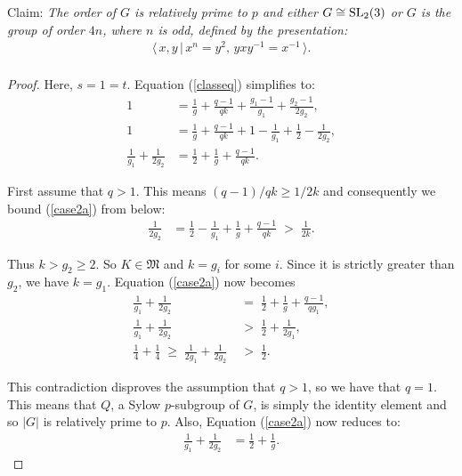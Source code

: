 \begin{theorem}[Case II]
Claim: \textit{The order of $G$ is relatively prime to $p$ and either $G \cong \operatorname{SL}_2(3)$ or $G$ is the group of order $4n$, where $n$ is odd, defined by the presentation:}
\begin{align*} \langle \, x,y \, | \, x^n = y^2, \, yxy^{-1} = x^{-1} \, \rangle. \\
\end{align*}
\end{theorem}
\begin{proof} Here, $s = 1 = t$. Equation (\ref{classeq}) simplifies to:
\begin{align}\label{case2a} 1 &= \frac{1}{g} + \frac{q-1}{qk} + \frac{g_1-1}{g_1} +  \frac{g_2-1}{2g_2}, \nonumber
\\ 1 &= \frac{1}{g} + \frac{q-1}{qk} + 1 - \frac{1}{g_1} + \frac{1}{2} - \frac{1}{2g_2}, \nonumber
\\ \frac{1}{g_1}  + \frac{1}{2g_2} &= \frac{1}{2} + \frac{1}{g} + \frac{q-1}{qk}.
\end{align}

First assume that $q>1$. This means $(q-1)/qk \geq 1/2k$ and consequently we bound (\ref{case2a}) from below:
\begin{align*} \frac{1}{2g_2} &= \frac{1}{2} - \frac{1}{g_1} + \frac{1}{g} + \frac{q-1}{qk} \; > \; \frac{1}{2k}.
\end{align*}

Thus $k > g_2 \geq 2$. So $K \in \mathfrak{M}$ and $k=g_i$ for some $i$. Since it is strictly greater than $g_2$, we have $k=g_1$. Equation (\ref{case2a}) now becomes
\begin{align*} \frac{1}{g_1}  + \frac{1}{2g_2} \; &= \; \frac{1}{2} + \frac{1}{g} + \frac{q-1}{qg_1},
\\ \frac{1}{g_1}  + \frac{1}{2g_2} \; &> \; \frac{1}{2} + \frac{1}{2g_1},
\\ \frac{1}{4} + \frac{1}{4} \; \geq \; \frac{1}{2g_1}  + \frac{1}{2g_2} \; &> \; \frac{1}{2}.
\end{align*}

This contradiction disproves the assumption that $q > 1$, so we have that $q = 1$. This means that $Q$, a Sylow $p$-subgroup of $G$, is simply the identity element and so $|G|$ is relatively prime to $p$. Also, Equation (\ref{case2a}) now reduces to:
\begin{align}\label{case2b} \frac{1}{g_1}  + \frac{1}{2g_2} &= \frac{1}{2} + \frac{1}{g}.
\end{align}


\end{proof}
